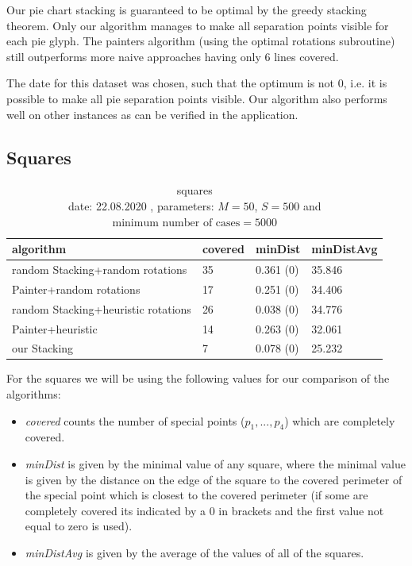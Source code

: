 \documentclass[a4paper,11pt]{article}
\begin{document}
Our pie chart stacking is guaranteed to be optimal by the greedy stacking theorem. Only our algorithm manages to make all separation points visible for each pie glyph. The painters algorithm (using the optimal rotations subroutine) still outperforms more naive approaches having only 6 lines covered.

The date for this dataset was chosen, such that the optimum is not $0$, i.e. it is possible to make all pie separation points visible. Our algorithm also performs well on other instances as can be verified in the application.


\subsection*{Squares}

\begin{table}[h]
  \begin{center}
    \begin{tabular}{| l || l | l | l|  }
      \hline
      algorithm                           & covered & minDist   & minDistAvg \\
      \hline

      random Stacking+random rotations    & 35      & 0.361 (0) & 35.846     \\

      Painter+random rotations            & 17      & 0.251 (0) & 34.406     \\

      random Stacking+heuristic rotations & 26      & 0.038 (0) & 34.776     \\

      Painter+heuristic                   & 14      & 0.263 (0) & 32.061     \\

      our Stacking                        & 7       & 0.078 (0) & 25.232     \\

      \hline
    \end{tabular}
  \end{center}
  \caption{squares\\
    date: 22.08.2020  , parameters: $M=50$, $S=500$ and $\text{minimum number of cases}=5000$  }

\end{table}

For the squares we will be using the following values for our comparison of the algorithms:

\begin{itemize}
  \item \textit{covered} counts the number of special points ($p_1,...,p_4$) which are completely covered.
  \item \textit{minDist} is given by the minimal value of any square, where the minimal value is given by the distance on the edge of the square to the covered perimeter of the special point which is closest to the covered perimeter (if some are completely covered its indicated by a 0 in brackets and the first value not equal to zero is used).
  \item \textit{minDistAvg} is given by the average of the values of all of the squares.
\end{itemize}
\end{document}
